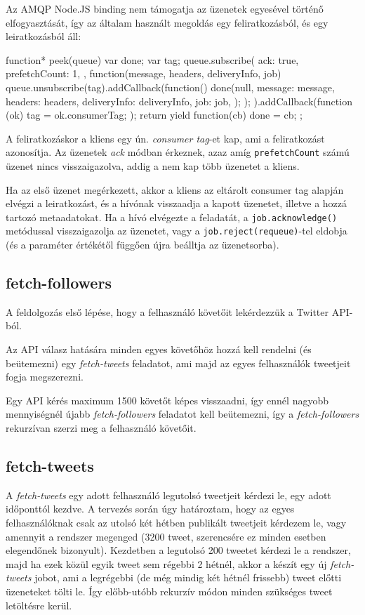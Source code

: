 Az AMQP Node.JS binding nem támogatja az üzenetek egyesével történő
elfogyasztását, így az általam használt megoldás egy feliratkozásból,
és egy leiratkozásból áll:

\begin{js}
function* peek(queue) {
  var done;
  var tag;
  queue.subscribe({
    ack: true,
    prefetchCount: 1,
  }, function(message, headers, deliveryInfo, job) {
    queue.unsubscribe(tag).addCallback(function() {
      done(null, {
        message: message,
        headers: headers,
        deliveryInfo: deliveryInfo,
        job: job,
      });
    });
  }).addCallback(function (ok) {
    tag = ok.consumerTag;
  });
  return yield function(cb) {
    done = cb;
  };
}
\end{js}

A feliratkozáskor a kliens egy ún. \emph{consumer tag}-et kap,
ami a feliratkozást azonosítja. Az üzenetek \emph{ack} módban érkeznek,
azaz amíg \verb=prefetchCount= számú üzenet nincs visszaigazolva,
addig a nem kap több üzenetet a kliens.

Ha az első üzenet megérkezett, akkor a kliens az eltárolt consumer tag
alapján elvégzi a leiratkozást, és a hívónak visszaadja a kapott üzenetet,
illetve a hozzá tartozó metaadatokat. Ha a hívó elvégezte a feladatát,
a \verb=job.acknowledge()= metódussal visszaigazolja az üzenetet,
vagy a \verb=job.reject(requeue)=-tel eldobja (és a paraméter értékétől
függően újra beálltja az üzenetsorba).

\subsection{fetch-followers}

A feldolgozás első lépése, hogy a felhasználó követőit lekérdezzük a Twitter
API-ból.

Az API válasz hatására minden egyes követőhöz hozzá kell rendelni
(és beütemezni) egy \emph{fetch-tweets} feladatot,
ami majd az egyes felhasználók tweetjeit fogja megszerezni.

Egy API kérés maximum 1500 követőt képes visszaadni, így ennél nagyobb
mennyiségnél újabb \emph{fetch-followers} feladatot kell beütemezni,
így a \emph{fetch-followers} rekurzívan szerzi meg a felhasználó követőit.

\subsection{fetch-tweets}

A \emph{fetch-tweets} egy adott felhasználó legutolsó tweetjeit kérdezi le,
egy adott időponttól kezdve. A tervezés során úgy határoztam, hogy az egyes
felhasználóknak csak az utolsó két hétben publikált tweetjeit kérdezem le,
vagy amennyit a rendszer megenged (3200 tweet, szerencsére ez minden
esetben elegendőnek bizonyult).
Kezdetben a legutolsó 200 tweetet kérdezi le a rendszer,
majd ha ezek közül egyik tweet sem régebbi 2 hétnél,
akkor a készít egy új \emph{fetch-tweets} jobot, ami a legrégebbi
(de még mindig két hétnél frissebb) tweet előtti üzeneteket tölti le.
Így előbb-utóbb rekurzív módon minden szükséges tweet letöltésre kerül.

